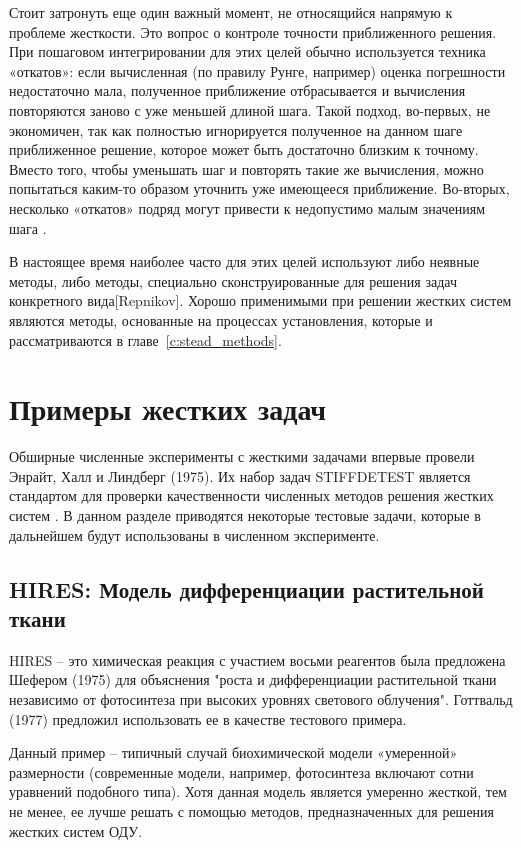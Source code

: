 \documentclass[a4paper,14pt]{extreport}
\begin{document}
 
 Стоит затронуть еще один важный момент, не относящийся напрямую к проблеме жесткости. Это вопрос о контроле точности приближенного решения. При пошаговом интегрировании для этих целей обычно используется техника «откатов»: если вычисленная (по правилу Рунге, например) оценка погрешности недостаточно мала, полученное приближение отбрасывается и вычисления повторяются заново с уже меньшей длиной шага. Такой подход, во-первых, не экономичен, так как полностью игнорируется полученное на данном шаге приближенное решение, которое может быть достаточно близким к точному. Вместо того, чтобы уменьшать шаг и повторять такие же вычисления, можно попытаться каким-то образом уточнить уже имеющееся приближение. Во-вторых, несколько «откатов» подряд могут привести к недопустимо малым
значениям шага \cite{Faleichik Vych alg}.

В настоящее время наиболее часто для этих целей используют либо неявные методы, либо методы, специально сконструированные для решения задач конкретного вида[Repnikov]. Хорошо применимыми при решении жестких систем являются методы, основанные на процессах установления, которые и рассматриваются в главе~\ref{c:stead_methods}. 

  
  \section{Примеры жестких задач}
  \label{s:stiff_examples}  
  Обширные численные эксперименты с жесткими задачами впервые провели Энрайт, Халл и Линдберг (1975). Их набор задач STIFFDETEST является стандартом для проверки качественности численных методов решения жестких систем \cite{hairer}. В данном разделе приводятся некоторые тестовые задачи, которые в дальнейшем будут использованы в численном эксперименте.
  
  \subsection{HIRES: Модель дифференциации растительной ткани}
  \label{ss:hires}
  HIRES -- это химическая реакция с участием восьми реагентов была предложена Шефером (1975) для объяснения "роста и дифференциации растительной ткани независимо от фотосинтеза при высоких уровнях светового облучения". Готтвальд (1977) предложил использовать ее в качестве тестового примера\cite{hairer}.
  
 Данный пример -- типичный случай биохимической модели «умеренной» размерности (современные модели, например, фотосинтеза включают сотни уравнений подобного типа). Хотя данная модель является умеренно жесткой, тем не менее, ее лучше решать с помощью методов, предназначенных для решения жестких систем ОДУ\cite{holodov}.
   
\end{document}
